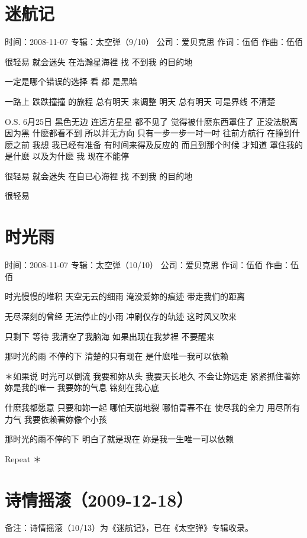 \documentclass[UTF8,a4paper,oneside,twocolumn,12pt]{ctexbook}
\newcommand{\infopair}[2]{\textbullet #1：#2}
\newcommand{\zc}[1][伍佰]{\infopair{作词}{#1}}
\newcommand{\zq}[1][伍佰]{\infopair{作曲}{#1}}
\newcommand{\zj}[1]{\infopair{专辑}{#1}}
\newcommand{\sj}[1]{\infopair{时间}{#1}}
\newcommand{\bz}[1]{\infopair{备注}{#1}}
\newcommand{\gs}[1]{\infopair{公司}{#1}}
\newenvironment{info}{\begin{flushleft}\kaishu
	}
	{\end{flushleft}\normalsize\yahei\par}
\newenvironment{lyric}{
	}
{}
\begin{document}
\section{迷航记}
\begin{info}
	\sj{2008-11-07}
	\zj{太空弹（9/10）}
	\gs{爱贝克思}
	\zc
	\zq
\end{info}
\begin{lyric}
	很轻易 就会迷失 在浩瀚星海裡
	找 不到我 的目的地

	一定是哪个错误的选择
	看 都 是黑暗

	一路上 跌跌撞撞 的旅程
	总有明天 来调整
	明天 总有明天
	可是界线 不清楚

	O.S.
	6月25日 黑色无边 连远方星星
	都不见了 觉得被什麽东西罩住了
	正没法脱离 因为黑 什麽都看不到
	所以并无方向 只有一步一步一吋一吋
	往前方航行 在撞到什麽之前
	我想 我已经有准备 有时间来得及反应的
	而且到那个时候 才知道 罩住我的是什麽
	以及为什麽 我 现在不能停

	很轻易 就会迷失 在自已心海裡
	找 不到我 的目的地

	很轻易
\end{lyric}

\section{时光雨}
\begin{info}
	\sj{2008-11-07}
	\zj{太空弹（10/10）}
	\gs{爱贝克思}
	\zc
	\zq
\end{info}
\begin{lyric}
	时光慢慢的堆积
	天空无云的细雨
	淹没爱妳的痕迹
	带走我们的距离

	无尽深刻的曾经
	无法停止的小雨
	冲刷仅存的轨迹
	这时风又吹来

	只剩下 等待
	我清空了我脑海
	如果出现在我梦裡
	不要醒来

	那时光的雨 不停的下
	清楚的只有现在
	是什麽唯一我可以依赖

	＊如果说
	时光可以倒流
	我要和妳从头
	我要天长地久
	不会让妳远走
	紧紧抓住著妳
	妳是我的唯一
	我要妳的气息
	铭刻在我心底

	什麽我都愿意
	只要和妳一起
	哪怕天崩地裂
	哪怕青春不在
	使尽我的全力
	用尽所有力气
	我要依赖著妳像个小孩

	那时光的雨不停的下
	明白了就是现在
	妳是我一生唯一可以依赖

	Repeat ＊
\end{lyric}

\section*{诗情摇滚（2009-12-18）}
\begin{info}
	\bz{诗情摇滚（10/13）为《迷航记》，已在《太空弹》专辑收录。}
\end{info}
\end{document}
